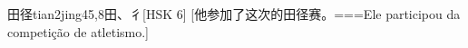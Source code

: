 \begin{EntryWithPhonetic}{田径}{tian2jing4}{5,8}{⽥、⼻}[HSK 6]
  [他参加了这次的田径赛。===Ele participou da competição de atletismo.]
\end{EntryWithPhonetic}
